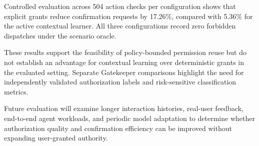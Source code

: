 \documentclass[10pt,conference]{IEEEtran}
\begin{document}
Controlled evaluation across 504 action
checks per configuration shows that explicit
grants reduce confirmation requests by
17.26\%, compared with 5.36\% for the
active contextual learner. All three
configurations record zero forbidden
dispatches under the scenario oracle.

These results support the feasibility of
policy-bounded permission reuse but do not
establish an advantage for contextual learning
over deterministic grants in the evaluated
setting. Separate Gatekeeper comparisons
highlight the need for independently
validated authorization labels and
risk-sensitive classification metrics.

Future evaluation will examine longer
interaction histories, real-user feedback,
end-to-end agent workloads, and periodic
model adaptation to determine whether
authorization quality and confirmation
efficiency can be improved without
expanding user-granted authority.



\end{document}
